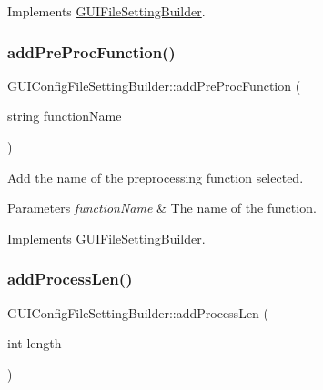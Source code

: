 Implements \mbox{\hyperlink{class_g_u_i_file_setting_builder_a7af95f9102bb6b78f6f0b8827b19b286}{G\+U\+I\+File\+Setting\+Builder}}.

\mbox{\label{class_g_u_i_config_file_setting_builder_afc97c2bd21304022f9a658325b58bf27}} 
\subsubsection{\texorpdfstring{add\+Pre\+Proc\+Function()}{addPreProcFunction()}}
{\footnotesize\ttfamily G\+U\+I\+Config\+File\+Setting\+Builder\+::add\+Pre\+Proc\+Function (\begin{DoxyParamCaption}\item[{string}]{function\+Name }\end{DoxyParamCaption})\hspace{0.3cm}{\ttfamily [virtual]}}



Add the name of the preprocessing function selected. 


\begin{DoxyParams}{Parameters}
{\em function\+Name} & The name of the function. \\
\hline
\end{DoxyParams}


Implements \mbox{\hyperlink{class_g_u_i_file_setting_builder_ad1b6098cd9d6f18d1aaf4ab3af87d9df}{G\+U\+I\+File\+Setting\+Builder}}.

\mbox{\label{class_g_u_i_config_file_setting_builder_a889dd395439312fa995862319327e425}} 
\subsubsection{\texorpdfstring{add\+Process\+Len()}{addProcessLen()}}
{\footnotesize\ttfamily G\+U\+I\+Config\+File\+Setting\+Builder\+::add\+Process\+Len (\begin{DoxyParamCaption}\item[{int}]{length }\end{DoxyParamCaption})\hspace{0.3cm}{\ttfamily [virtual]}}



